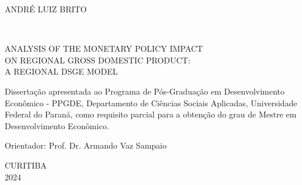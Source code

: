 \documentclass[../thesis.tex]{subfiles}
\begin{document}
	
	\begin{center}
					
			
	ANDRÉ LUIZ BRITO
			
	\vspace*{2cm}
			
	\textcolor{white}{white text}
			
	\vspace*{5cm}
			
	ANALYSIS OF THE MONETARY POLICY IMPACT \\
	ON REGIONAL GROSS DOMESTIC PRODUCT: \\
	A REGIONAL DSGE MODEL

	\vspace*{1cm}

	\begin{adjustwidth}{8cm}{0pt}

	\begin{singlespace}		

	\begin{justify}
		
	\sloppy \fontsize{10}{10}\selectfont Dissertação apresentada ao Programa de Pós-Graduação em Desenvolvimento Econômico - PPGDE, Departamento de Ciências Sociais Aplicadas, Universidade Federal do Paraná, como requisito parcial para a obtenção do grau de Mestre em Desenvolvimento Econômico.
		
	\end{justify}
	
	\end{singlespace}
							
		\fontsize{10}{10}\selectfont Orientador: Prof. Dr. Armando Vaz Sampaio
			
							
	\end{adjustwidth}

	\vfill
			
	CURITIBA \\	
	2024
			
	\vspace*{1cm}
	
	\end{center}
	
	\thispagestyle{empty}
	
	\newpage
	
\end{document}
